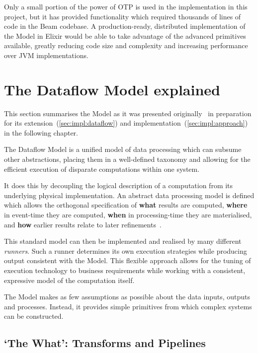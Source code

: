 Only a small portion of the power of OTP is used in the implementation in this project, but it has provided functionality which required thousands of lines of code in the Beam codebase.
A production-ready, distributed implementation of the Model in Elixir would be able to take advantage of the advanced primitives available, greatly reducing code size and complexity and increasing performance over JVM implementations.

\section{The Dataflow Model explained}\label{sec:prep:dataflow}

This section summarises the Model as it was presented originally~\cite{Akidau:2015} in preparation for its extension~(\cref{sec:impl:dataflow}) and implementation~(\cref{sec:impl:approach}) in the following chapter.

The Dataflow Model is a unified model of data processing which can subsume other abstractions, placing them in a well-defined taxonomy and allowing for the efficient execution of disparate computations within one system.

It does this by decoupling the logical description of a computation from its underlying physical implementation.
An abstract data processing model is defined which allows the orthogonal specification of \textbf{what} results are computed, \textbf{where} in event-time they are computed, \textbf{when} in processing-time they are materialised, and \textbf{how} earlier results relate to later refinements~\cite[p.~1793]{Akidau:2015}.

This standard model can then be implemented and realised by many different \emph{runners}. 
Such a runner determines its own execution strategies while producing output consistent with the Model.
This flexible approach allows for the tuning of execution technology to business requirements while working with a consistent, expressive model of the computation itself.

The Model makes as few assumptions as possible about the data inputs, outputs and processes. 
Instead, it provides simple primitives from which complex systems can be constructed.

\subsection{`The What': Transforms and Pipelines}\label{sec:prep:dataflow:what}

